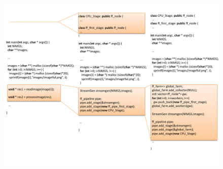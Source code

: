 \documentclass[smallextended]{svjour3}
\begin{document}
\begin{figure}
\begin{center}
\includegraphics[width=0.99\linewidth]{figures/refactoring.pdf}
%
%
%
%
%
%

\end{center}
\end{figure}
\end{document}
